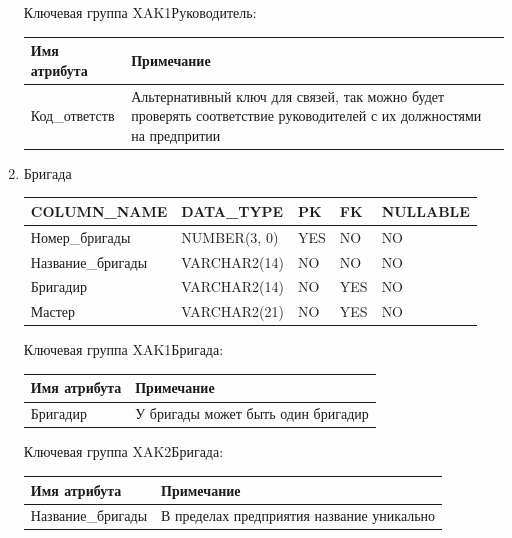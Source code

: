 \begin{enumerate}
    Ключевая группа XAK1Руководитель:

    \begin{tabular}{|p{7cm}|p{9.3cm}|} \hline

        {\bf Имя атрибута} & {\bf Примечание} \\ \hline
        Код\_ответств & Альтернативный ключ для связей, так можно будет проверять соответствие руководителей с их должностями на предпритии \\ \hline

    \end{tabular}

    \item{Бригада}

    \begin{tabular}{|p{7cm}|p{3cm}|p{1cm}|p{1cm}|p{3cm}|} \hline

        {\bf COLUMN\_NAME} & {\bf DATA\_TYPE} & {\bf PK} & {\bf FK} & {\bf NULLABLE} \\ \hline
        Номер\_бригады & NUMBER(3, 0) & YES & NO & NO \\ \hline
        Название\_бригады & VARCHAR2(14) & NO & NO & NO \\ \hline
        Бригадир & VARCHAR2(14) & NO & YES & NO \\ \hline
        Мастер & VARCHAR2(21) & NO & YES & NO \\ \hline

    \end{tabular}

    Ключевая группа XAK1Бригада:

    \begin{tabular}{|p{7cm}|p{9.3cm}|} \hline

        {\bf Имя атрибута} & {\bf Примечание} \\ \hline
        Бригадир & У бригады может быть один бригадир\\ \hline

    \end{tabular}

    Ключевая группа XAK2Бригада:

    \begin{tabular}{|p{7cm}|p{9.3cm}|} \hline

        {\bf Имя атрибута} & {\bf Примечание} \\ \hline
        Название\_бригады & В пределах предприятия название уникально \\ \hline

    \end{tabular}


\end{enumerate}
